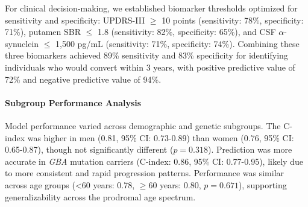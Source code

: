 For clinical decision-making, we established biomarker thresholds optimized for sensitivity and specificity: UPDRS-III $\geq$ 10 points (sensitivity: 78\%, specificity: 71\%), putamen SBR $\leq$ 1.8 (sensitivity: 82\%, specificity: 65\%), and CSF $\alpha$-synuclein $\leq$ 1,500 pg/mL (sensitivity: 71\%, specificity: 74\%). Combining these three biomarkers achieved 89\% sensitivity and 83\% specificity for identifying individuals who would convert within 3 years, with positive predictive value of 72\% and negative predictive value of 94\%.

\paragraph{Subgroup Performance Analysis}
Model performance varied across demographic and genetic subgroups. The C-index was higher in men (0.81, 95\% CI: 0.73-0.89) than women (0.76, 95\% CI: 0.65-0.87), though not significantly different ($p = 0.318$). Prediction was more accurate in \textit{GBA} mutation carriers (C-index: 0.86, 95\% CI: 0.77-0.95), likely due to more consistent and rapid progression patterns. Performance was similar across age groups (<60 years: 0.78, $\geq$60 years: 0.80, $p = 0.671$), supporting generalizability across the prodromal age spectrum.
